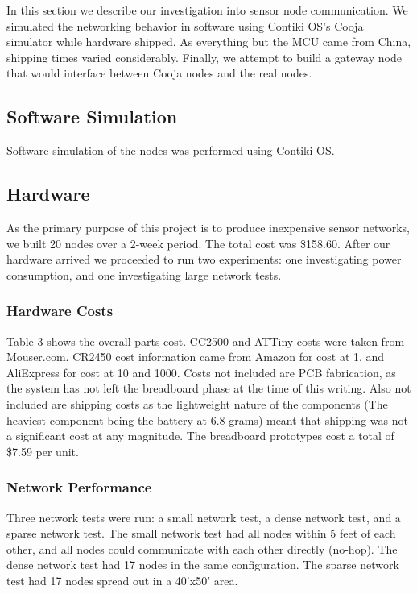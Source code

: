 In this section we describe our investigation into sensor node communication. We simulated the networking behavior in software using Contiki OS's Cooja simulator while hardware shipped. As everything but the MCU came from China, shipping times varied considerably. Finally, we attempt to build a gateway node that would interface between Cooja nodes and the real nodes.

\subsection{Software Simulation}

Software simulation of the nodes was performed using Contiki OS. 

\subsection{Hardware}

As the primary purpose of this project is to produce inexpensive sensor networks, we built 20 nodes over a 2-week period. The total cost was \$158.60. After our hardware arrived we proceeded to run two experiments: one investigating power consumption, and one investigating large network tests.

\subsubsection{Hardware Costs}

Table 3 shows the overall parts cost. CC2500 and ATTiny costs were taken from Mouser.com. CR2450 cost information came from Amazon for cost at 1, and AliExpress for cost at 10 and 1000. Costs not included are PCB fabrication, as the system has not left the breadboard phase at the time of this writing. Also not included are shipping costs as the lightweight nature of the components (The heaviest component being the battery at 6.8 grams) meant that shipping was not a significant cost at any magnitude. The breadboard prototypes cost a total of \$7.59 per unit.

\subsubsection{Network Performance} 
Three network tests were run: a small network test, a dense network test, and a sparse network test. The small network test had all nodes within 5 feet of each other, and all nodes could communicate with each other directly (no-hop). The dense network test had 17 nodes in the same configuration. The sparse network test had 17 nodes spread out in a 40'x50' area.

